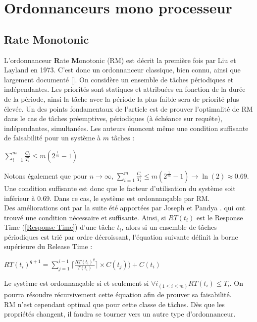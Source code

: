\documentclass[11pt,a4paper,oneside]{report}
\begin{document}
\section{Ordonnanceurs mono processeur}

\subsection{Rate Monotonic}
L'ordonnanceur \textbf{R}ate \textbf{M}onotonic (RM) est décrit la première fois par Liu et Layland \cite{liulayland} en 1973. C'est 
donc un ordonnanceur classique, bien connu, ainsi que largement documenté [\cite{omarkermia}]. 
On considère un ensemble de tâches périodiques et indépendantes.
Les priorités sont statiques et attribuées en fonction de la durée de la période, ainsi 
la tâche avec la période la plus faible sera de priorité plus élevée. 
Un des points fondamentaux de l'article est de prouver l'optimalité de RM dans le cas de tâches 
préemptives, périodiques (à échéance sur requête), indépendantes, simultanées.
Les auteurs énoncent même une condition suffisante de faisabilité pour un système à $m$ tâches : \\
\begin{center}
	$\sum_{i=1}^{m}\frac{C_i}{T_i} \leq m(2^{\frac{1}{m}}-1)$
\end{center}
Notons également que pour $n \rightarrow \infty$, $\sum_{i=1}^{m}\frac{C_i}{T_i} \leq m(2^{\frac{1}{m}}-1) \rightarrow \ln(2) \approx 0.69$.
Une condition suffisante est donc que le facteur d'utilisation du système soit inférieur à 0.69. 
Dans ce cas, le système est ordonnançable par RM.\\

Des améliorations ont par la suite été apportées par Joseph et Pandya \cite{DBLP}.
qui ont trouvé une condition nécessaire et suffisante. 
Ainsi, si $RT(t_i)$ est le Response Time (\ref{Response Time}) d'une tâche $t_i$, 
alors si un ensemble de tâches périodiques est trié par ordre décroissant, l'équation suivante 
définit la borne supérieure du Release Time :
\begin{center}
	$RT(t_i)^{q+1} = \sum_{j=1}^{i-1} \lceil \frac{RT(t_i)^q}{T(t_i)} \rceil \times C(t_j)) + C(t_i)$
\end{center}
Le système est ordonnançable si et seulement si $\forall i_{(1 \leq i \leq m)}RT(t_i) \leq T_i$.
On pourra résoudre récursivement cette équation afin de prouver sa faisabilité.\\

RM n'est cependant optimal que pour cette classe de tâches. Dès que les propriétés changent, 
il faudra se tourner vers un autre type d'ordonnanceur.
\end{document}
